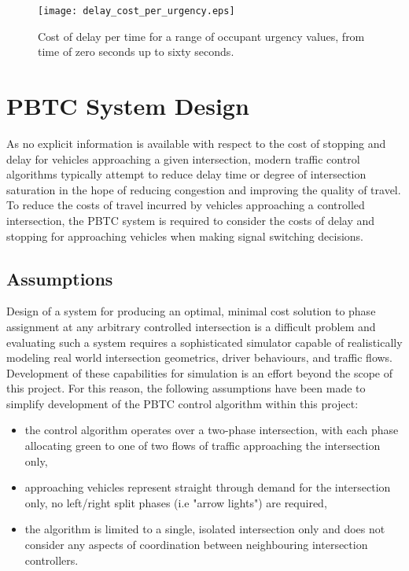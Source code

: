 
\begin{figure}[]
\centering
	\texttt{[image: delay\_cost\_per\_urgency.eps]}
	\caption{Cost of delay per time for a range of occupant urgency values, from time of zero seconds up to sixty seconds. }
\label{delaycosturgency}
\end{figure}

\section{PBTC System Design}
 
As no explicit information is available with respect to the cost of stopping and delay for vehicles approaching a given intersection, modern traffic control algorithms typically attempt to reduce delay time or degree of intersection saturation in the hope of reducing congestion and improving the quality of travel. To reduce the costs of travel incurred by vehicles approaching a controlled intersection, the PBTC system is required to consider the costs of delay and stopping for approaching vehicles when making signal switching decisions.

\subsection{Assumptions}

Design of a system for producing an optimal, minimal cost solution to phase assignment at any arbitrary controlled intersection is a difficult problem and evaluating such a system requires a sophisticated simulator capable of realistically modeling real world intersection geometrics, driver behaviours, and traffic flows. Development of these capabilities for simulation is an effort beyond the scope of this project. For this reason, the following assumptions have been made to simplify development of the PBTC control algorithm within this project:

\begin{itemize}
\item the control algorithm operates over a two-phase intersection, with each phase allocating green to one of two flows of traffic approaching the intersection only,
\item approaching vehicles represent straight through demand for the intersection only, no left/right split phases (i.e "arrow lights") are required,
\item the algorithm is limited to a single, isolated intersection only and does not consider any aspects of coordination between neighbouring intersection controllers.
\end{itemize}

